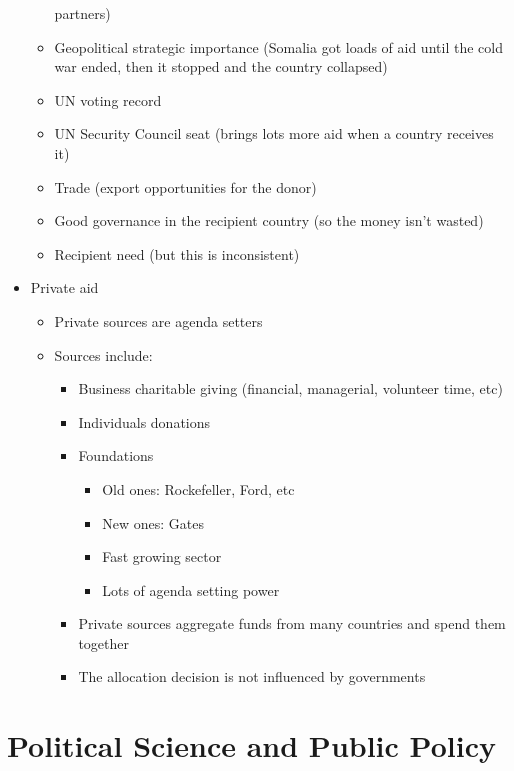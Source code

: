 \documentclass[11pt]{article}
\begin{document}
\begin{itemize}
\begin{itemize}
partners)
\item Geopolitical strategic importance (Somalia got loads of aid until the cold
war ended, then it stopped and the country collapsed)
\item UN voting record
\item UN Security Council seat (brings lots more aid when a country receives it)
\item Trade (export opportunities for the donor)
\item Good governance in the recipient country (so the money isn't wasted)
\item Recipient need (but this is inconsistent)
\end{itemize}
\item Private aid
\begin{itemize}
\item Private sources are agenda setters
\item Sources include:
\begin{itemize}
\item Business charitable giving (financial, managerial, volunteer time, etc)
\item Individuals donations
\item Foundations
\begin{itemize}
\item Old ones: Rockefeller, Ford, etc
\item New ones: Gates
\item Fast growing sector
\item Lots of agenda setting power
\end{itemize}
\item Private sources aggregate funds from many countries and spend them together
\item The allocation decision is not influenced by governments
\end{itemize}
\end{itemize}
\end{itemize}
\section{Political Science and Public Policy}
\label{sec:org8cc47d9}
\end{document}
